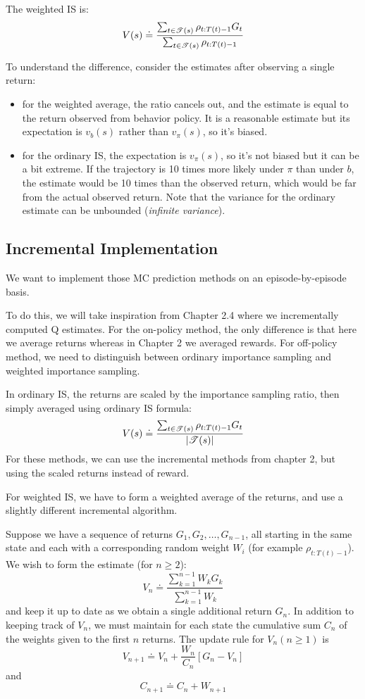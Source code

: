 \documentclass[sutton_barto_notes.tex]{subfiles}
\begin{document}
The weighted IS is:
$$ V(s) \doteq \frac{ \sum_{t \in \mathscr{T} (s)} \rho_{t:T(t)-1} G_t }{ \sum_{t \in \mathscr{T} (s)} \rho_{t:T(t)-1} } $$

To understand the difference, consider the estimates after observing a single return:
\begin{itemize}
\item for the weighted average, the ratio cancels out, and the estimate is equal to the return observed from behavior policy. It is a reasonable estimate but its expectation is $v_b(s)$ rather than $v_\pi(s)$, so it's biased.
\item for the ordinary IS, the expectation is $v_\pi(s)$, so it's not biased but it can be a bit extreme. If the trajectory is 10 times more likely under $\pi$ than under $b$, the estimate would be 10 times than the observed return, which would be far from the actual observed return. Note that the variance for the ordinary estimate can be unbounded (\textit{infinite variance}).
\end{itemize}

\subsection{Incremental Implementation}
We want to implement those MC prediction methods on an episode-by-episode basis.

To do this, we will take inspiration from Chapter 2.4 where we incrementally computed Q estimates. For the on-policy method, the only difference is that here we average returns whereas in Chapter 2 we averaged rewards. For off-policy method, we need to distinguish between ordinary importance sampling and weighted importance sampling.

In ordinary IS, the returns are scaled by the importance sampling ratio, then simply averaged using ordinary IS formula:
$$ V(s) \doteq \frac{\sum_{t \in \mathscr{T} (s)} \rho_{t:T(t)-1} G_t }{ | \mathscr{T}(s) |} $$
For these methods, we can use the incremental methods from chapter 2, but using the scaled returns instead of reward.

For weighted IS, we have to form a weighted average of the returns, and use a slightly different incremental algorithm.

Suppose we have a sequence of returns $G_1, G_2, \dots, G_{n-1}$, all starting in the same state and each with a corresponding random weight $W_i$ (for example $\rho_{t:T(t)-1}$). We wish to form the estimate (for $n\geq 2$):
$$ V_n \doteq \frac{\sum_{k=1}^{n-1} W_k G_k }{ \sum_{k=1}^{n-1} W_k } $$
and keep it up to date as we obtain a single additional return $G_n$. In addition to keeping track of $V_n$, we must maintain for each state the cumulative sum $C_n$ of the weights given to the first $n$ returns. The update rule for $V_n (n \geq 1)$ is 
$$ V_{n+1} \doteq V_n + \frac{W_n}{C_n} [G_n - V_n] $$
and
$$ C_{n+1} \doteq C_n + W_{n+1} $$
\end{document}

